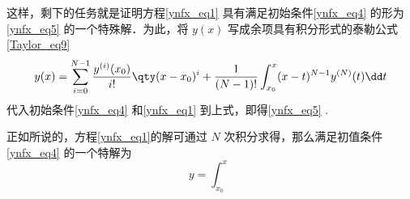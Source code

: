 这样，剩下的任务就是证明方程\autoref{ynfx_eq1} 具有满足初始条件\autoref{ynfx_eq4} 的形为\autoref{ynfx_eq5} 的一个特殊解．为此，将 $y(x)$ 写成余项具有积分形式的泰勒公式\autoref{Taylor_eq9}~
\begin{equation}
y(x)=\sum_{i=0}^{N-1}\frac{y^{(i)}(x_0)}{i!}\qty(x-x_0)^{i}+\frac{1}{(N-1)!}\int_{x_0}^{x}(x-t)^{N-1}y^{(N)}(t)\dd t
\end{equation}
代入初始条件\autoref{ynfx_eq4} 和\autoref{ynfx_eq1} 到上式，即得\autoref{ynfx_eq5} .

正如所说的，方程\autoref{ynfx_eq1}的解可通过 $N$ 次积分求得，那么满足初值条件\autoref{ynfx_eq4} 的一个特解为
\begin{equation}
y=\int_{x_0}^x
\end{equation}
